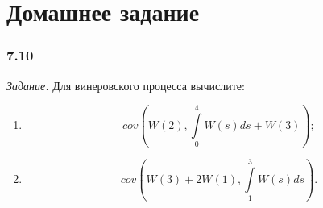 \section*{Домашнее задание}

\subsubsection*{7.10}

\textit{Задание.}
Для винеровского процесса вычислите:
\begin{enumerate}[label=\alph*)]
  \item $$cov \left(
      W \left( 2 \right), \int \limits_0^4 W \left( s \right) ds + W \left( 3 \right) \right);$$
  \item $$cov \left(
      W \left( 3 \right) + 2 W \left( 1 \right), \int \limits_1^3 W \left( s \right) ds \right).$$
\end{enumerate}

